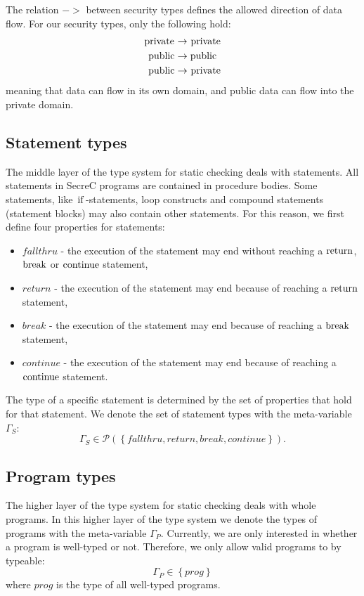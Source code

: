 \documentclass[a4paper, 10pt, draft]{report}
\newcommand{\mycode}[1]{\ensuremath{\mbox{\lstinline{#1}}}}
\begin{document}
The relation $->$ between security types defines the allowed direction of data
flow. For our security types, only the following hold:
\begin{align*}
  \mycode{private} & -> \mycode{private} \\
  \mycode{public}  & -> \mycode{public} \\
  \mycode{public}  & -> \mycode{private}
\end{align*}
meaning that data can flow in its own domain, and public data can flow into the
private domain.

\subsection{Statement types}
The middle layer of the type system for static checking deals with statements.
All statements in SecreC programs are contained in procedure bodies. Some
statements, like \mycode{if}-statements, loop constructs and compound
statements (statement blocks) may also contain other statements. For this
reason, we first define four properties for statements:
\begin{itemize}
\item $fallthru$ - the execution of the statement may end without reaching a
\mycode{return}, \mycode{break} or \mycode{continue} statement,
\item $return$ - the execution of the statement may end because of reaching a
\mycode{return} statement,
\item $break$ - the execution of the statement may end because of reaching a
\mycode{break} statement,
\item $continue$ - the execution of the statement may end because of reaching a
\mycode{continue} statement.
\end{itemize}

The type of a specific statement is determined by the set of properties that
hold for that statement. We denote the set of statement types with the
meta-variable $\Gamma_S$:
\[
\Gamma_S \in \mathcal{P}\!\left(\left\{ fallthru, return, break, continue \right\}\right).
\]

\subsection{Program types}
The higher layer of the type system for static checking deals with whole
programs. In this higher layer of the type system we denote the types of
programs with the meta-variable $\Gamma_P$. Currently, we are only interested
in whether a program is well-typed or not. Therefore, we only allow valid
programs to by typeable:
\[
\Gamma_P \in \left\{prog\right\}
\]
where $prog$ is the type of all well-typed programs.
\end{document}

